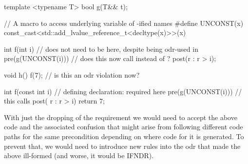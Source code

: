 \begin{codeblock}
template <typename T>
bool g(T&& t);

// A macro to access underlying variable of -ified names
#define UNCONST(x) const_cast<std::add_lvalue_reference_t<decltype(x)>>(x)

int f(int i)  //  does not need to be  here, despite being odr-used in 
  pre(g(UNCONST(i)))   // does this now call  instead of ?
  post(r : r > i);  

void h() {
  f(7);  // is this an odr violation now?
}

int f(const int i)  // defining declaration:  required here
  pre(g(UNCONST(i)))  // this calls 
  post( r : r > i) {
  return 7; 
}
\end{codeblock}
With just the dropping of the  requirement we would need to accept the above code and the associated confusion that might arise from following different code paths for the same precondition depending on where code for it is generated.  To prevent that, we would need to introduce new rules into the odr that made the above ill-formed (and worse, it would be IFNDR).

